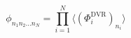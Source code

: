 \begin{equation}
    \phi_{n_1 n_2 ... n_N} = \prod_{i = 1}^{N} \langle  (\Phi^{\mathrm{DVR}}_i)_{n_i} \rangle
\label{eq:dvr_multi_basis}
\end{equation}
